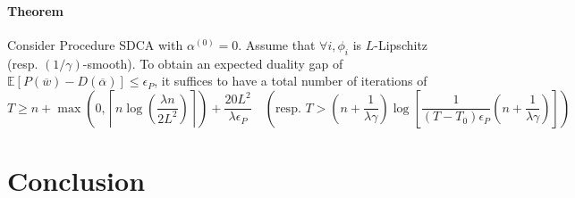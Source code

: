 \documentclass{article}
\begin{document}
\paragraph{Theorem} Consider Procedure SDCA with $\alpha^{(0)} = 0$.
Assume that $\forall i, \phi_i$ is $L$-Lipschitz (resp.
$(1/\gamma)$-smooth).
To obtain an expected duality gap of $\mathbb{E}[P(\overline{w})-D(\overline{\alpha})] \leq \epsilon_P$, it suffices to have a total number of iterations of
\begin{equation}
	T \geq n + \max\left(0, \left\lceil n \log \left(\dfrac{\lambda n}{2 L^2} \right) \right\rceil \right) + \dfrac{20 L^2}{\lambda \epsilon_P} \quad \left( \text{resp. } T > \left(n + \dfrac{1}{\lambda \gamma} \right) \log \left[ \dfrac{1}{(T-T_0)\epsilon_P} \left(n + \dfrac{1}{\lambda \gamma} \right) \right] \right)
\end{equation}


\newpage
\section{Conclusion}
\end{document}
